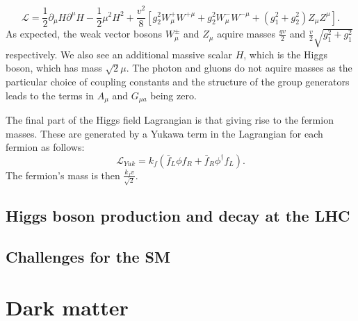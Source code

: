 \begin{equation}
  \mathcal{L}=\frac{1}{2}\partial_{\mu}H\partial^{\mu}H-\frac{1}{2}\mu^{2}H^{2}+\frac{v^{2}}{8}\left[g_{2}^{2}W_{\mu}^{+}W^{+\mu}+g_{2}^{2}W_{\mu}^{-}W^{-\mu}+\left(g_{1}^{2}+g_{2}^{2}\right)Z_{\mu}Z^{\mu}\right].
\end{equation}
As expected, the weak vector bosons $W_{\mu}^{\pm}$ and $Z_{\mu}$ aquire masses $\frac{gv}{2}$ and $\frac{v}{2}\sqrt{g_{1}^{2}+g_{1}^{2}}$ respectively. We also see an additional massive scalar $H$, which is the Higgs boson, which has mass $\sqrt{2}\mu$. The photon and gluons do not aquire masses as the particular choice of coupling constants and the structure of the group generators leads to the terms in $A_{\mu}$ and $G_{\mu a}$ being zero.

The final part of the Higgs field Lagrangian is that giving rise to the fermion masses. These are generated by a Yukawa term in the Lagrangian for each fermion as follows:
\begin{equation}
  \mathcal{L}_{Yuk}=k_{f}\left(\bar{f}_{L}\phi f_{R}+\bar{f}_{R}\phi^{\dag}f_{L}\right).
\end{equation}
The fermion's mass is then $\frac{k_{f}v}{\sqrt{2}}$.







\subsection{Higgs boson production and decay at the LHC}
\label{sec:higprod}
\subsection{Challenges for the SM}
\label{sec:SMchallenges}


\section{Dark matter}
\label{sec:DM}


